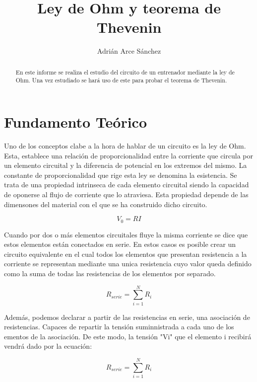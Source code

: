 \documentclass[a4paper,11pt]{article}
\begin{document}
\begin{titlepage}
\title{Ley de Ohm y teorema de Thevenin}
\author{Adrián Arce Sánchez}
\maketitle
\end{titlepage}

\begin{abstract}

En este informe se realiza el estudio del circuito de un entrenador mediante la ley de Ohm. Una vez estudiado se hará uso de este para probar el teorema de Thevenin.
\end{abstract}

\section{Fundamento Teórico}
Uno de los conceptos clabe a la hora de hablar de un circuito es la ley de Ohm. Esta, establece una relación de proporcionalidad entre la corriente que circula por un elemento circuital y la diferencia de potencial en los extremos del mismo. La constante de proporcionalidad que rige esta ley se denomina la esistencia. Se trata de una propiedad intrinseca de cada elemento circuital siendo la capacidad de oponerse al flujo de corriente que lo atraviesa. Esta propiedad depende de las dimensones del material con el que se ha construido dicho circuito.

\begin{displaymath}
V_{0}=RI
\end{displaymath}

Cuando por dos o más elementos circuitales fluye la misma corriente se dice que estos elementos están conectados en serie. En estos casos es posible crear un circuito equivalente en el cual todos los elementos que presentan resistencia a la corriente se representan mediante una unica resistencia cuyo valor queda definido como la suma de todas las resistencias de los elementos por separado.

\begin{displaymath}
R_{serie}=\sum_{i=1}^N R_{i}
\end{displaymath}

Además, podemos declarar a partir de las resistencias en serie, una asociación de resistencias. Capaces de repartir la tensión suminnistrada a cada uno de los ementos de la asociación. De este modo, la tensión "Vi" que el elemento i recibirá vendrá dado por la ecuación:

\begin{displaymath}
R_{serie}=\sum_{i=1}^N R_{i}
\end{displaymath}
\end{document}
